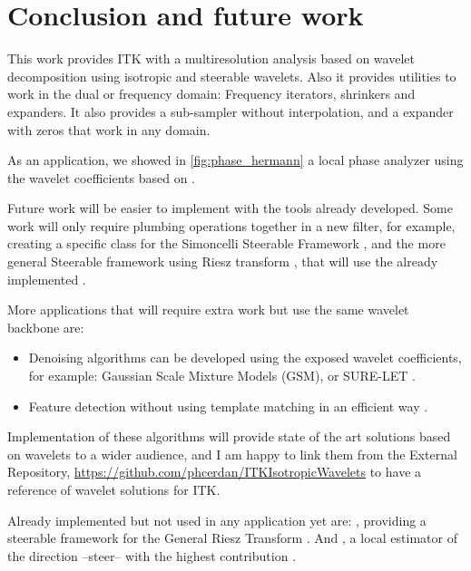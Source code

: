 \section{Conclusion and future work}
\label{sec:Conclusion}

This work provides ITK with a multiresolution analysis based on wavelet decomposition using isotropic and steerable wavelets. Also it provides utilities to work in the dual or frequency domain: Frequency iterators, shrinkers and expanders. It also provides a sub-sampler without interpolation, and a expander with zeros that work in any domain.

As an application, we showed in \autoref{fig:phase_hermann} a local phase analyzer using the wavelet coefficients based on \cite{held_steerable_2010}.

Future work will be easier to implement with the tools already developed. Some work will only require plumbing operations together in a new filter, for example, creating a specific class for the Simoncelli Steerable Framework \cite{simoncelli_steerable_1995}, and the more general Steerable framework using Riesz transform \cite{unser_steerable_2011}, that will use the already implemented .

More applications that will require extra work but use the same wavelet backbone are:
\begin{itemize}[topsep=0pt]
  \item Denoising algorithms can be developed using the exposed wavelet coefficients, for example: Gaussian Scale Mixture Models (GSM)\cite{portilla_image_2003}, or SURE-LET \cite{blu_sure-let_2007}.
  \item Feature detection without using template matching in an efficient way \cite{puspoki_template-free_2015}.
\end{itemize}

 Implementation of these algorithms will provide state of the art solutions based on wavelets to a wider audience, and I am happy to link them from the External Repository, \url{https://github.com/phcerdan/ITKIsotropicWavelets} to have a reference of wavelet solutions for ITK.

 Already implemented but not used in any application yet are: , providing a steerable framework for the General Riesz Transform \cite{unser_steerable_2011}. And , a local estimator of the direction --steer-- with the highest contribution \cite{chenouard_3d_2012}.

